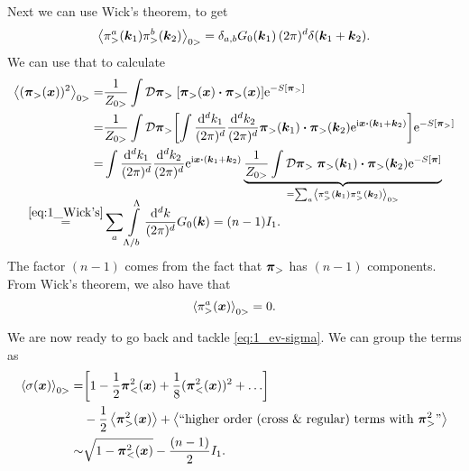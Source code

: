 \documentclass[11pt,letter, swedish, english
]{article}
\begin{document}
Next we can use Wick's theorem, to get
\begin{equation}\label{eq:1_Wick's}
\ev{\pi_>^a(\vb*k_1)\pi_>^b(\vb*k_2)}_{0>}
= \delta_{a, b} G_0(\vb*k_1) \,(2\pi)^d \delta(\vb*k_1 + \vb*k_2).
\end{equation}
We can use that to calculate
\begin{equation}
\begin{aligned}
\ev{(\vb*\pi_>(\vb*x))^2}_{0>} =& \frac{1}{Z_{0>}}
\int \mathcal{D}\vb*\pi_>\; 
[\vb*\pi_>(\vb*x)\vdot\vb*\pi_>(\vb*x)] \ee^{-S[\vb*\pi_>]}\\
=& \frac{1}{Z_{0>}} \int \mathcal{D}\vb*\pi_>
\qty[\int\frac{\rd^dk_1}{(2\pi)^d}\frac{\rd^dk_2}{(2\pi)^d}
\vb*\pi_>(\vb*k_1)\vdot\vb*\pi_>(\vb*k_2) \ee^{\ii\vb*x\vdot(\vb*k_1+\vb*k_2)}]
\ee^{-S[\vb*\pi_>]} \\
=& \int\frac{\rd^dk_1}{(2\pi)^d}\frac{\rd^dk_2}{(2\pi)^d}
\ee^{\ii\vb*x\vdot(\vb*k_1+\vb*k_2)}
\underbrace{\frac{1}{Z_{0>}} \int \mathcal{D}\vb*\pi_>\; 
\vb*\pi_>(\vb*k_1)\vdot\vb*\pi_>(\vb*k_2) 
\ee^{-S[\vb*\pi]}}_{=\sum_a\ev{\pi_>^a(\vb*k_1)\pi_>^a(\vb*k_2)}_{0>}}\\[-8pt]
\stackrel{\eqref{eq:1_Wick's}}{=}& 
\sum_a \int_{\Lambda/b}^\Lambda\frac{\rd^dk}{(2\pi)^d}G_0(\vb*k)
= (n-1) I_1.
\end{aligned}
\end{equation}
The factor $(n-1)$ comes from the fact that $\vb*\pi_>$ has $(n-1)$
components. From Wick's theorem, we also have that
\begin{equation}
\ev{\pi_>^a(\vb*x)}_{0>} = 0.
\end{equation}

We are now ready to go back and tackle \eqref{eq:1_ev-sigma}. We can
group the terms as
\begin{equation}\label{eq:1_ev-sigma2}
\begin{aligned}
\ev{\sigma(\vb*x)}_{0>} 
=& \qty[1 - \frac{1}{2}\vb*\pi_<^2(\vb*x) 
+ \frac{1}{8}(\vb*\pi_<^2(\vb*x))^2 +\ldots]\\
&- \frac{1}{2}\ev{\vb*\pi_>^2(\vb*x)} 
+\ev{\text{``higher order (cross \& regular) terms with }
\vb*\pi_>^2\text{''}}\\
\sim&\sqrt{1-\vb*\pi_<^2(\vb*x)} -\frac{(n-1)}{2} I_1.
\end{aligned}
\end{equation}

\end{document}
